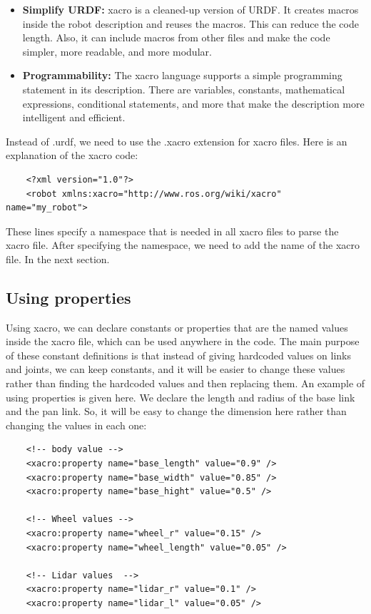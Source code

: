 \documentclass[../../main]{subfiles}
\begin{document}
\begin{itemize}
    \item \textbf{Simplify URDF:} xacro is a cleaned-up version of URDF. It creates macros inside the robot description and reuses the macros. This can reduce the code length. Also, it can include macros from other files and make the code simpler, more readable, and more modular.
    \item \textbf{Programmability:} The xacro language supports a simple programming statement in its description. There are variables, constants, mathematical expressions, conditional statements, and more that make the description more intelligent and efficient.
\end{itemize}

Instead of .urdf, we need to use the .xacro extension for xacro files.
Here is an explanation of the xacro code:
\begin{verbatim}
    <?xml version="1.0"?>
    <robot xmlns:xacro="http://www.ros.org/wiki/xacro" name="my_robot">
\end{verbatim}
These lines specify a namespace that is needed in all xacro files to parse the xacro file.
After specifying the namespace, we need to add the name of the xacro file. In the next section.

\subsection{Using properties}
Using xacro, we can declare constants or properties that are the named values inside the
xacro file, which can be used anywhere in the code. The main purpose of these constant
definitions is that instead of giving hardcoded values on links and joints, we can keep
constants, and it will be easier to change these values rather than finding the hardcoded
values and then replacing them.
An example of using properties is given here. We declare the length and radius of the
base link and the pan link. So, it will be easy to change the dimension here rather than
changing the values in each one:

\begin{verbatim}
    <!-- body value -->
    <xacro:property name="base_length" value="0.9" />
    <xacro:property name="base_width" value="0.85" />
    <xacro:property name="base_hight" value="0.5" />
    
    <!-- Wheel values -->
    <xacro:property name="wheel_r" value="0.15" />
    <xacro:property name="wheel_length" value="0.05" />
    
    <!-- Lidar values  -->
    <xacro:property name="lidar_r" value="0.1" />
    <xacro:property name="lidar_l" value="0.05" />
\end{verbatim}
\end{document}
